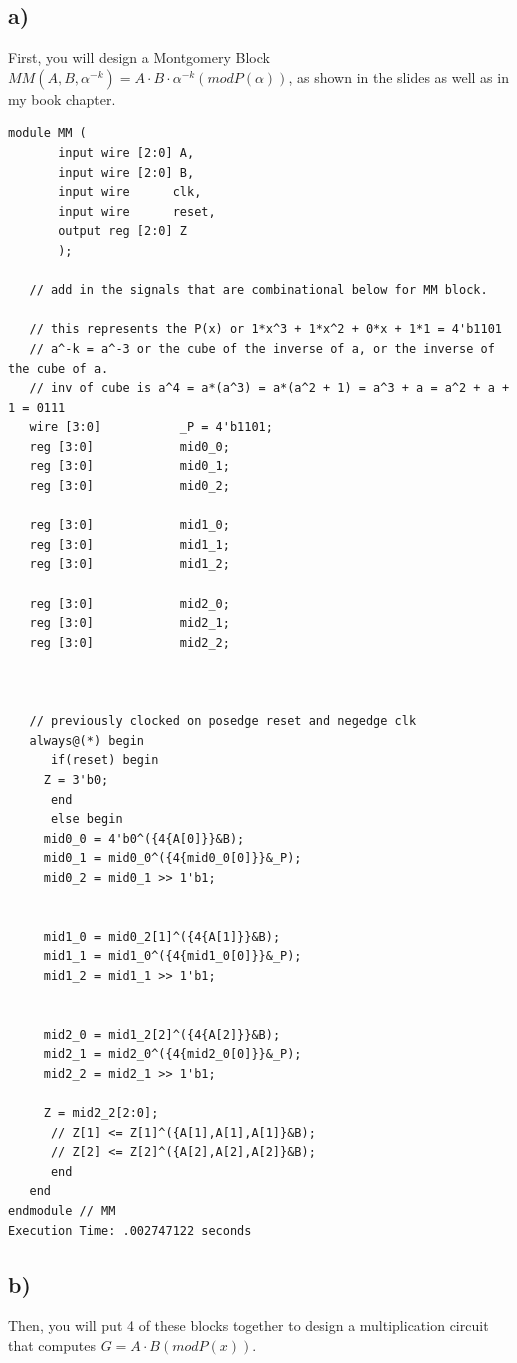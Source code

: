 \documentclass[a4paper,11pt]{exam}
\begin{document}
\subsection{a)}
\label{sec:org2369f9c}
First, you will design a Montgomery Block \(MM(A, B, \alpha^{-k} ) = A \cdot B \cdot \alpha^{-k} (mod P(\alpha))\), as shown in the slides as well as in my book chapter.
\begin{lstlisting}
module MM (
	   input wire [2:0] A,
	   input wire [2:0] B,
	   input wire	   clk,
	   input wire	   reset,
	   output reg [2:0] Z
	   );

   // add in the signals that are combinational below for MM block.

   // this represents the P(x) or 1*x^3 + 1*x^2 + 0*x + 1*1 = 4'b1101
   // a^-k = a^-3 or the cube of the inverse of a, or the inverse of the cube of a.
   // inv of cube is a^4 = a*(a^3) = a*(a^2 + 1) = a^3 + a = a^2 + a + 1 = 0111
   wire [3:0]		    _P = 4'b1101;
   reg [3:0]		    mid0_0;
   reg [3:0]		    mid0_1;
   reg [3:0]		    mid0_2;

   reg [3:0]		    mid1_0;
   reg [3:0]		    mid1_1;
   reg [3:0]		    mid1_2;

   reg [3:0]		    mid2_0;
   reg [3:0]		    mid2_1;
   reg [3:0]		    mid2_2;
   

   
   // previously clocked on posedge reset and negedge clk
   always@(*) begin
      if(reset) begin
	 Z = 3'b0;
      end
      else begin
	 mid0_0 = 4'b0^({4{A[0]}}&B);
	 mid0_1 = mid0_0^({4{mid0_0[0]}}&_P);
	 mid0_2 = mid0_1 >> 1'b1;


	 mid1_0 = mid0_2[1]^({4{A[1]}}&B);
	 mid1_1 = mid1_0^({4{mid1_0[0]}}&_P);
	 mid1_2 = mid1_1 >> 1'b1;


	 mid2_0 = mid1_2[2]^({4{A[2]}}&B);
	 mid2_1 = mid2_0^({4{mid2_0[0]}}&_P);
	 mid2_2 = mid2_1 >> 1'b1;
 	 
	 Z = mid2_2[2:0];      
      // Z[1] <= Z[1]^({A[1],A[1],A[1]}&B);      
      // Z[2] <= Z[2]^({A[2],A[2],A[2]}&B);
      end
   end
endmodule // MM
Execution Time: .002747122 seconds
\end{lstlisting}

\subsection{b)}
\label{sec:org100dffc}
Then, you will put 4 of these blocks together to design a multiplication circuit that computes \(G = A \cdot B (mod P(x))\).
\end{document}
